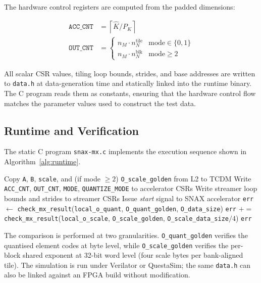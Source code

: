 The hardware control registers are computed from the padded dimensions:

\begin{align}
\mathtt{ACC\_CNT} &= \left\lceil \hat{K} / P_K \right\rceil
  \label{eq:acc_cnt} \\
\mathtt{OUT\_CNT} &=
  \begin{cases}
    n_M \cdot n_N^{\mathrm{tile}} & \text{mode} \in \{0, 1\} \\
    n_M \cdot n_N^{\mathrm{blk}}  & \text{mode} \geq 2
  \end{cases}
  \label{eq:out_cnt}
\end{align}

All scalar CSR values, tiling loop bounds, strides, and base addresses
are written to \texttt{data.h} at data-generation time and statically
linked into the runtime binary.  The C program reads them as constants,
ensuring that the hardware control flow matches the parameter values
used to construct the test data.

\subsection{Runtime and Verification}
\label{sec:integration:runtime}

The static C program \texttt{snax-mx.c} implements the execution
sequence shown in Algorithm~\ref{alg:runtime}.

\begin{algorithm}[h]
\caption{Runtime execution flow in \texttt{snax-mx.c}}
\label{alg:runtime}
\DontPrintSemicolon
Copy \texttt{A}, \texttt{B}, \texttt{scale}, and (if mode $\geq 2$)
  \texttt{O\_scale\_golden} from L2 to TCDM \;
Write \texttt{ACC\_CNT}, \texttt{OUT\_CNT}, \texttt{MODE},
  \texttt{QUANTIZE\_MODE} to accelerator CSRs \;
Write streamer loop bounds and strides to streamer CSRs \;
Issue \textit{start} signal to SNAX accelerator \;
\BlankLine
\texttt{err} $\leftarrow$ \texttt{check\_mx\_result}(\texttt{local\_o\_quant},
  \texttt{O\_quant\_golden}, \texttt{O\_data\_size}) \;
\texttt{err} $+\!\!=$
  \texttt{check\_mx\_result}(\texttt{local\_o\_scale},
    \texttt{O\_scale\_golden}, \texttt{O\_scale\_data\_size$/4$}) \;
\Return \texttt{err}
\end{algorithm}

The comparison is performed at two granularities.
\texttt{O\_quant\_golden} verifies the quantised element codes at byte
level, while \texttt{O\_scale\_golden} verifies the per-block shared
exponent at 32-bit word level (four scale bytes per bank-aligned tile).
The simulation is run under Verilator or QuestaSim; the same
\texttt{data.h} can also be linked against an FPGA build without
modification.
